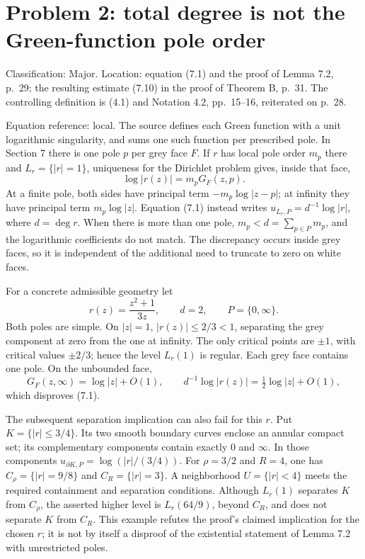 \documentclass[10pt]{article}
\begin{document}
\section*{Problem 2: total degree is not the Green-function pole order}
Classification: Major. Location: equation (7.1) and the proof of Lemma 7.2, p. 29; the resulting estimate (7.10) in the proof of Theorem B, p. 31. The controlling definition is (4.1) and Notation 4.2, pp. 15–16, reiterated on p. 28.\par
Equation reference: local. The source defines each Green function with a unit logarithmic singularity, and sums one such function per prescribed pole. In Section 7 there is one pole \(p\) per grey face \(F\). If \(r\) has local pole order \(m_p\) there and \(L_r=\{|r|=1\}\), uniqueness for the Dirichlet problem gives, inside that face, \[
 \log|r(z)|=m_p G_F(z,p).\] At a finite pole, both sides have principal term \(-m_p\log|z-p|\); at infinity they have principal term \(m_p\log|z|\). Equation (7.1) instead writes \(u_{L_r,P}=d^{-1}\log|r|\), where \(d=\deg r\). When there is more than one pole, \(m_p<d=\sum_{p\in P}m_p\), and the logarithmic coefficients do not match. The discrepancy occurs inside grey faces, so it is independent of the additional need to truncate to zero on white faces.\par
For a concrete admissible geometry let \[r(z)=\frac{z^2+1}{3z},\qquad d=2,\qquad P=\{0,\infty\}.\] Both poles are simple. On \(|z|=1\), \(|r(z)|\le2/3<1\), separating the grey component at zero from the one at infinity. The only critical points are \(\pm1\), with critical values \(\pm2/3\); hence the level \(L_r(1)\) is regular. Each grey face contains one pole. On the unbounded face, \[G_F(z,\infty)=\log|z|+O(1),\qquad
 d^{-1}\log|r(z)|=\tfrac12\log|z|+O(1),\] which disproves (7.1).\par
The subsequent separation implication can also fail for this \(r\). Put \(K=\{|r|\le3/4\}\). Its two smooth boundary curves enclose an annular compact set; its complementary components contain exactly \(0\) and \(\infty\). In those components \(u_{\partial K,P}=\log(|r|/(3/4))\). For \(\rho=3/2\) and \(R=4\), one has \(C_\rho=\{|r|=9/8\}\) and \(C_R=\{|r|=3\}\). A neighborhood \(U=\{|r|<4\}\) meets the required containment and separation conditions. Although \(L_r(1)\) separates \(K\) from \(C_\rho\), the asserted higher level is \(L_r(64/9)\), beyond \(C_R\), and does not separate \(K\) from \(C_R\). This example refutes the proof’s claimed implication for the chosen \(r\); it is not by itself a disproof of the existential statement of Lemma 7.2 with unrestricted poles.\par
\end{document}
